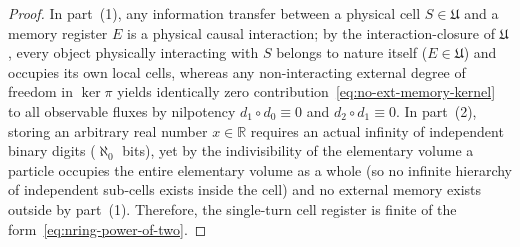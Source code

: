 \documentclass[11pt,a4paper]{article}
\theoremstyle{plain}
\theoremstyle{definition}
\begin{document}
\begin{proof}
In part~(1), any information transfer between a physical cell $S \in \mathfrak{U}$ and a memory register $E$ is a physical causal interaction; by the interaction-closure of $\mathfrak{U}$, every object physically interacting with $S$ belongs to nature itself ($E \in \mathfrak{U}$) and occupies its own local cells, whereas any non-interacting external degree of freedom in $\ker\pi$ yields identically zero contribution~\eqref{eq:no-ext-memory-kernel} to all observable fluxes by nilpotency $d_1\circ d_0 \equiv 0$ and $d_2\circ d_1 \equiv 0$. In part~(2), storing an arbitrary real number $x \in \mathbb{R}$ requires an actual infinity of independent binary digits ($\aleph_0$ bits), yet by the indivisibility of the elementary volume a particle occupies the entire elementary volume as a whole (so no infinite hierarchy of independent sub-cells exists inside the cell) and no external memory exists outside by part~(1). Therefore, the single-turn cell register is finite of the form~\eqref{eq:nring-power-of-two}.
\end{proof}
\end{document}
